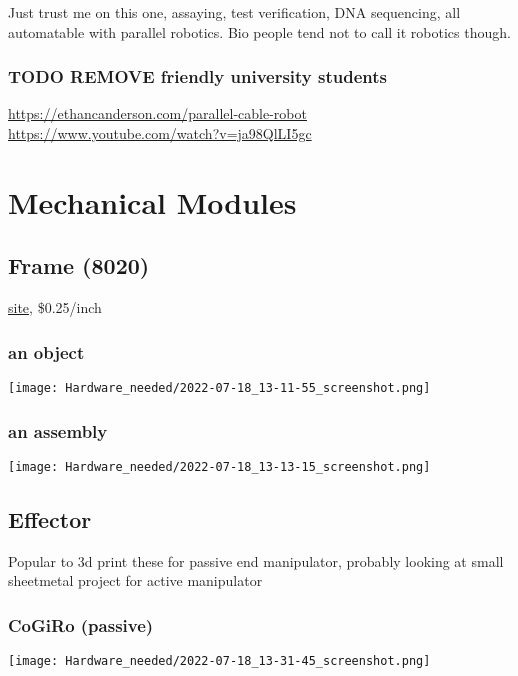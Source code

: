 \documentclass[11pt]{article}
\begin{document}
Just trust me on this one, assaying, test verification, DNA sequencing, all automatable with parallel robotics. Bio people tend not to call it robotics though.

\subsubsection{{\bfseries\sffamily TODO} REMOVE friendly university students}
\label{sec:org0306bfc}

\url{https://ethancanderson.com/parallel-cable-robot}
\url{https://www.youtube.com/watch?v=ja98QlLI5gc}
\section{Mechanical Modules}
\label{sec:org9c7ca5d}

\subsection{Frame (8020)}
\label{sec:org3d5d1dd}

\href{https://8020.net/20-2020.html}{site}, \$0.25/inch


\subsubsection{an object}
\label{sec:orge0e219f}
\begin{center}
\texttt{[image: Hardware\_needed/2022-07-18\_13-11-55\_screenshot.png]}
\end{center}
\subsubsection{an assembly}
\label{sec:orgc86fcdd}
\begin{center}
\texttt{[image: Hardware\_needed/2022-07-18\_13-13-15\_screenshot.png]}
\end{center}

\subsection{Effector}
\label{sec:orgeb69816}

Popular to 3d print these for passive end manipulator, probably looking at small sheetmetal project for active manipulator

\subsubsection{CoGiRo (passive)}
\label{sec:orgff5968b}
\begin{center}
\texttt{[image: Hardware\_needed/2022-07-18\_13-31-45\_screenshot.png]}
\end{center}
\end{document}
